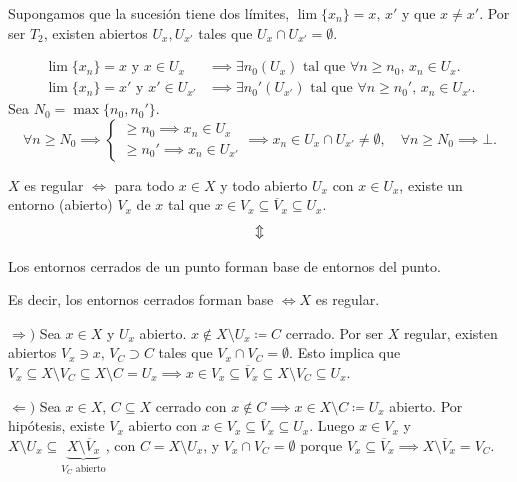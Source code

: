 \begin{dem}
    Supongamos que la sucesión tiene dos límites, $\lim \{x_n\} = x, \, x'$ y que $x \ne x'$. Por ser $T_2$, existen abiertos $U_x, U_{x'}$ tales que $U_x \cap U_{x'} = \emptyset$.
    
    \begin{align*}
        \lim \{x_n\} = x \text{ y } x \in U_x &\implies \exists n_0(U_x) \text{ tal que } \forall n \ge n_0, \, x_n \in U_x. \\
        \lim \{x_n\} = x' \text{ y } x' \in U_{x'} &\implies \exists n_0'(U_{x'}) \text{ tal que } \forall n \ge n_0', \, x_n \in U_{x'}.
    \end{align*}
    Sea $N_0 = \max\{n_0, n_0'\}$.
    \[
        \forall n \ge N_0 \implies 
        \begin{cases} 
            \ge n_0 \implies x_n \in U_x \\ 
            \ge n_0' \implies x_n \in U_{x'} 
        \end{cases} 
        \implies x_n \in U_x \cap U_{x'} \ne \emptyset, \quad \forall n \ge N_0 \implies \bot.
    \]
    \end{dem}
\begin{prop}
    $X$ es regular $\iff$ para todo $x \in X$ y todo abierto $U_x$ con $x \in U_x$, existe un entorno (abierto) $V_x$ de $x$ tal que $x \in V_x \subseteq \overline{V}_x \subseteq U_x$.\vspace{-0.3cm}
    \[\vspace{-0.4cm}
        \Updownarrow
    \]
    \begin{center}
        \small Los entornos cerrados de un punto forman base de entornos del punto.
    \end{center}
    Es decir, los entornos cerrados forman base $\iff X$ es regular.
\end{prop}

\begin{dem} $\Rightarrow) $ Sea $x \in X$ y $U_x$ abierto. $x \notin X \setminus U_x \coloneqq C$ cerrado. Por ser $X$ regular, existen abiertos $V_x \ni x, \, V_C \supset C$ tales que $V_x \cap V_C = \emptyset$.    
        Esto implica que $V_x \subseteq X \setminus V_C \subseteq X \setminus C = U_x \implies x \in V_x \subseteq \overline{V}_x \subseteq X \setminus V_C \subseteq U_x$.

        $\Leftarrow)$ Sea $x \in X, \, C \subseteq X$ cerrado con $x \notin C \implies x \in X \setminus C \coloneqq U_x$ abierto.     
        Por hipótesis, existe $V_x$ abierto con $x \in V_x \subseteq \overline{V}_x \subseteq U_x$.
        Luego $x \in V_x$ y $X \setminus U_x \subseteq \underbrace{X \setminus \overline{V}_x}_{V_C \text{ abierto}}$, con $C = X \setminus U_x$, y $V_x \cap V_C = \emptyset$ porque $V_x \subseteq \overline{V}_x \implies X \setminus \overline{V}_x = V_C$.
\end{dem}

